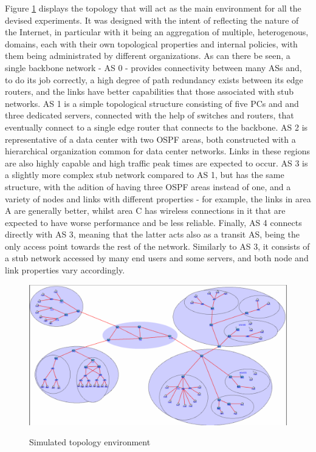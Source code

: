     Figure \ref{fig:test-topology} displays the topology that will act as the main environment for all the devised experiments.
    It was designed with the intent of reflecting the nature of the Internet, in particular with it being an aggregation of multiple, heterogenous, domains, each with their own topological properties and internal policies, with them being administrated by different organizations.
    As can there be seen, a single backbone network - AS 0 - provides connectivity between many ASs and, to do its job correctly, a high degree of path redundancy exists between its edge routers, and the links have better capabilities that those associated with stub networks.
    AS 1 is a simple topological structure consisting of five PCs and and three dedicated servers, connected with the help of switches and routers, that eventually connect to a single edge router that connects to the backbone.
    AS 2 is representative of a data center with two OSPF areas, both constructed with a hierarchical organization common for data center networks.
    Links in these regions are also highly capable and high traffic peak times are expected to occur.
    AS 3 is a slightly more complex stub network compared to AS 1, but has the same structure, with the adition of having three OSPF areas instead of one, and a variety of nodes and links with different properties - for example, the links in area A are generally better, whilst area C has wireless connections in it that are expected to have worse performance and be less reliable.
    Finally, AS 4 connects directly with AS 3, meaning that the latter acts also as a transit AS, being the only access point towards the rest of the network.
    Similarly to AS 3, it consists of a stub network accessed by many end users and some servers, and both node and link properties vary accordingly.


    \begin{figure}[ht]
    \centering
    \includegraphics[scale=0.5]{img/test-topology.png}
    \label{fig:test-topology}
    \caption{Simulated topology environment}
    \end{figure}



